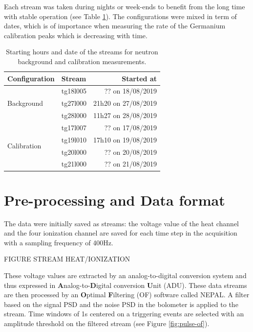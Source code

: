 Each stream was taken during nights or week-ends to benefit from the long time with stable operation (see Table \ref{tab:neutron-streams}). The configurations were mixed in term of dates, which is of importance when measuring the rate of the Germanium calibration peaks which is decreasing with time.

\begin{table}[]
\centering
\begin{tabular}{l|l|r}
Configuration                & Stream   & Started at          \\ \hline
\multirow{3}{*}{Background}  & tg18l005 & ?? on 18/08/2019    \\
                             & tg27l000 & 21h20 on 27/08/2019 \\
                             & tg28l000 & 11h27 on 28/08/2019 \\ \hline
\multirow{4}{*}{Calibration} & tg17l007 & ?? on 17/08/2019    \\
                             & tg19l010 & 17h10 on 19/08/2019 \\
                             & tg20l000 & ?? on 20/08/2019    \\
                             & tg21l000 & ?? on 21/08/2019   
\end{tabular}
\caption{Starting hours and date of the streams for neutron background and calibration measurements.}
\label{tab:neutron-streams}
\end{table}


\section{Pre-processing and Data format}
\label{par:data-format}
\label{par:of-processing}

The data were initially saved as streams: the voltage value of the heat channel and the four ionization channel are saved for each time step in the acquisition with a sampling frequency of 400Hz. 

{\color{red} FIGURE STREAM HEAT/IONIZATION}

These voltage values are extracted by an analog-to-digital conversion system and thus expressed in \textbf{A}nalog-to-\textbf{D}igital conversion \textbf{U}nit (ADU).
These data streams are then processed by an \textbf{O}ptimal \textbf{F}iltering (OF) software called NEPAL. A filter based on the signal PSD and the noise PSD in the bolometer is applied to the stream. Time windows of 1s centered on a triggering events are selected with an amplitude threshold on the filtered stream (see Figure \ref{fig:pulse-of}).

